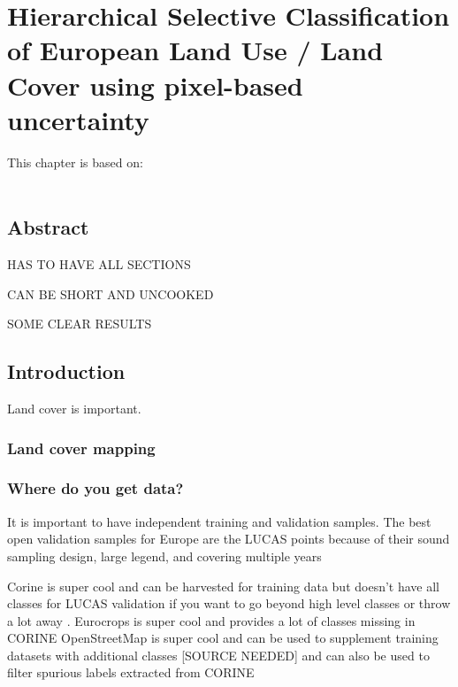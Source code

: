\chapter[Hierarchical Selective Classification]{Hierarchical Selective Classification of European Land Use / Land Cover using pixel-based uncertainty}
\label{cha:chapter4}
\vspace*{\fill}
This chapter is based on:
\\
\\
\newpage

\section*{Abstract}
HAS TO HAVE ALL SECTIONS

CAN BE SHORT AND UNCOOKED

SOME CLEAR RESULTS
\newpage

\section{Introduction}
Land cover is important. 

\subsection{Land cover mapping}

    \subsection{Where do you get data?}
    
        It is important to have independent training and validation samples. The best open validation samples for Europe are the LUCAS points \citep{dandrimont2021lucas,dandrimont2020harmonised} because of their sound sampling design, large legend, and covering multiple years \citep{venter2022global}
        
        Corine is super cool and can be harvested for training data\citep{witjes2022spatiotemporal,witjes2024iterative}
        but doesn't have all classes for LUCAS validation \citep{dandrimont2021lucas} if you want to go beyond high level classes or throw a lot away \citep{pflugmacher2019mapping}.
        Eurocrops is super cool and provides a lot of classes missing in CORINE \citep{schneider2023eurocrops}
        OpenStreetMap is super cool and can be used to supplement training datasets with additional classes [SOURCE NEEDED] and can also be used to filter spurious labels extracted from CORINE \citep{witjes2022spatiotemporal}

